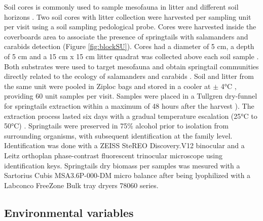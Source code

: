 Soil cores is commonly used to sample mesofauna in litter and different soil horizons \citep{chauvatChangesSoilFaunal2011a,farskaManagementIntensityAffects2014,pongeVerticalDistributionCollembola2000,salamonEffectsPlantDiversity2004,wuCompositionSpatiotemporalVariation2014}. 
Two soil cores with litter collection were harvested per sampling unit per visit using a soil sampling pedological probe. 
Cores were harvested inside the coverboards area to associate the presence of springtails with salamanders and carabids detection (Figure \ref{fig:blockSU}). 
Cores had a diameter of 5 cm, a depth of 5 cm and a 15 cm x 15 cm litter quadrat was collected above each soil sample \citep{raymond-leonardSpringtailCommunityStructure2018a,rousseauForestFloorMesofauna2018}.
Both substrates were used to target mesofauna and obtain springtail communities directly related to the ecology of salamanders and carabids \citep{chauvatChangesSoilFaunal2011a,edwardsAssessmentPopulationsSoilinhabiting1991,raymond-leonardSpringtailCommunityStructure2018a,rousseauForestFloorMesofauna2018}.
Soil and litter from the same unit were pooled in Ziploc\up{\texttrademark{}} bags and stored in a cooler at $\pm$ 4°C \citep{chauvatChangesSoilFaunal2011a,rousseauForestFloorMesofauna2018}, providing 60 unit samples per visit.
Samples were placed in a Tullgren dry-funnel for springtails extraction within a maximum of 48 hours after the harvest \citealp{rousseauForestFloorMesofauna2018,rusekBiodiversityCollembolaTheir1998,wuCompositionSpatiotemporalVariation2014}). 
The extraction process lasted six days with a gradual temperature escalation (25°C to 50°C) \citep{raymond-leonardSpringtailCommunityStructure2018a}.
Springtails were preserved in 75\% alcohol \citep{wuCompositionSpatiotemporalVariation2014} prior to isolation from surrounding organisms, with subsequent identification at the family level.
Identification was done with a ZEISS SteREO Discovery.V12 binocular and a Leitz orthoplan phase-contrast fluorescent trinocular microscope using \cite{bellingerChecklistCollembolaWorld1996} identification keys.
Springtails dry biomass per samples was mesured with a Sartorius Cubis\up{\texttrademark{}} MSA3.6P-000-DM micro balance after being lyophilized with a Labconco FreeZone Bulk tray dryers 78060 series.




\subsection*{Environmental variables}
\label{subsec:EnvVar}

